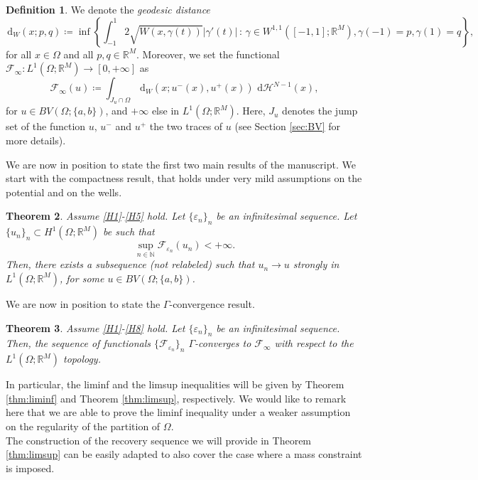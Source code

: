 \documentclass[a4paper, 11pt, reqno]{amsart}
\theoremstyle{plain}
\newtheorem{theorem}{Theorem}[section]
\theoremstyle{definition}
\newtheorem{definition}[theorem]{Definition}
\theoremstyle{remark}
\newcommand{\N}{\mathbb N}
\newcommand{\R}{\mathbb R}
\newcommand{\dd}{\,\mathrm{d}}
\newcommand{\dhno}{\,\dd{\mathcal H}^{N-1}}
\newcommand{\e}{\varepsilon}
\begin{document}
\begin{definition}
    We denote the \emph{geodesic distance}
    \[
        \dd_W(x;p,q) \coloneqq \inf\left\{ \int_{-1}^1 2\sqrt{W(x,\gamma(t))}|\gamma'(t)| \,:\, \gamma\in W^{1,1}([-1,1];\R^M), \gamma(-1)=p, \gamma(1)=q  \right\},
    \]
    for all $x\in\Omega$ and all $p,q\in\R^M$. Moreover, we set the functional $\mathcal{F}_\infty: L^1(\Omega;\R^M)\to[0,+\infty]$ as
    \[
        \mathcal{F}_\infty(u) \coloneqq \int_{J_u\cap \Omega} \dd_W(x; u^-(x), u^+(x)) \dhno(x),
    \]
    for $u\in BV(\Omega;\{a,b\})$, and $+\infty$ else in $L^1(\Omega;\R^M)$.
    Here, $J_u$ denotes the jump set of the function $u$, $u^-$ and $u^+$ the two traces of $u$ (see Section \ref{sec:BV} for more details).
\end{definition}

We are now in position to state the first two main results of the manuscript. We start with the compactness result, that holds under very mild assumptions on the potential and on the wells.

\begin{theorem}\label{thm:compactness}
Assume \ref{H1}-\ref{H5} hold.
Let $\{\e_n\}_n$ be an infinitesimal sequence.
Let $\{u_n\}_n \subset H^1(\Omega;\R^M)$ be such that
\[
\sup_{n\in\N} \mathcal{F}_{\varepsilon_n}(u_n) < +\infty.
\]
Then, there exists a subsequence (not relabeled) such that $u_{n}\to u$ strongly in $L^1(\Omega;\R^M)$, for some $u\in BV(\Omega; \{a,b\})$.
\end{theorem}
    
We are now in position to state the $\Gamma$-convergence result.

\begin{theorem}\label{thm:Gamma_conv}
Assume \ref{H1}-\ref{H8} hold.
Let $\{\e_n\}_n$ be an infinitesimal sequence.
Then, the sequence of functionals $\{\mathcal{F}_{\varepsilon_n}\}_n$ $\Gamma$-converges to $\mathcal{F}_\infty$ with respect to the $L^1(\Omega;\R^M)$ topology.
\end{theorem}

In particular, the liminf and the limsup inequalities will be given by Theorem \ref{thm:liminf} and Theorem \ref{thm:limsup}, respectively.
We would like to remark here that we are able to prove the liminf inequality under a weaker assumption on the regularity of the partition of $\Omega$.\\

The construction of the recovery sequence we will provide in Theorem \ref{thm:limsup} can be easily adapted to also cover the case where a mass constraint is imposed.
\end{document}
